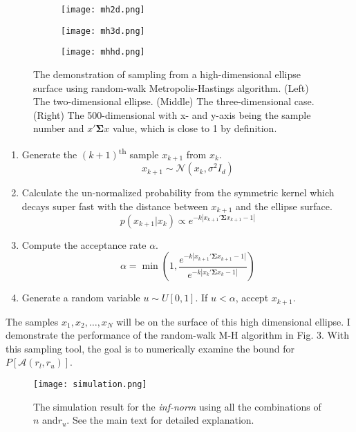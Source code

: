 \documentclass[a4paper, 11pt]{article}
\begin{document}
\begin{figure}[t!]
    \centering
    \begin{subfigure}
        \centering
        \texttt{[image: mh2d.png]}
    \end{subfigure}
    \begin{subfigure}
        \centering
        \texttt{[image: mh3d.png]}
    \end{subfigure}
    \begin{subfigure}
        \centering
        \texttt{[image: mhhd.png]}
    \end{subfigure}
    \caption{The demonstration of sampling from a high-dimensional ellipse surface using random-walk Metropolis-Hastings algorithm. (Left) The two-dimensional ellipse. (Middle) The three-dimensional case. (Right) The 500-dimensional with x- and y-axis being the sample number and $x'\mathbf{\Sigma}x$ value, which is close to 1 by definition. }
\end{figure}


\begin{enumerate}
\item Generate the $(k+1)$\textsuperscript{th} sample $x_{k+1}$ from $x_k$. 
\begin{equation}
x_{k+1} \sim \mathcal{N}(x_k, \sigma^2I_d)
\end{equation}
\item Calculate the un-normalized probability from the symmetric kernel which decays super fast with the distance between $x_{k+1}$ and the ellipse surface.
\begin{equation}
p(x_{k+1}|x_k) \propto e^{-k|x_{k+1}'\mathbf{\Sigma}x_{k+1} - 1|}
\end{equation}
\item Compute the acceptance rate $\alpha$. 
\begin{equation}
\alpha = \min\left(1, \frac{e^{-k|x_{k+1}'\mathbf{\Sigma}x_{k+1} - 1|}}{e^{-k|x_{k}'\mathbf{\Sigma}x_{k} - 1|}} \right)
\end{equation}
\item Generate a random variable $u \sim U[0,1]$. If $u<\alpha$, accept $x_{k+1}$. 
\end{enumerate}
The samples $x_1, x_2, \dots, x_N$ will be on the surface of this high dimensional ellipse. I demonstrate the performance of the random-walk M-H algorithm in Fig. 3. With this sampling tool, the goal is to numerically examine the bound for $P\left[\mathcal{A}(r_l, r_u)\right]$. 


\begin{figure}
  \centering
  \texttt{[image: simulation.png]}
  \caption{The simulation result for the \textit{inf-norm} using all the combinations of $n$ and$r_u$. See the main text for detailed explanation. }
  \label{fig:event}
\end{figure}
\end{document}

